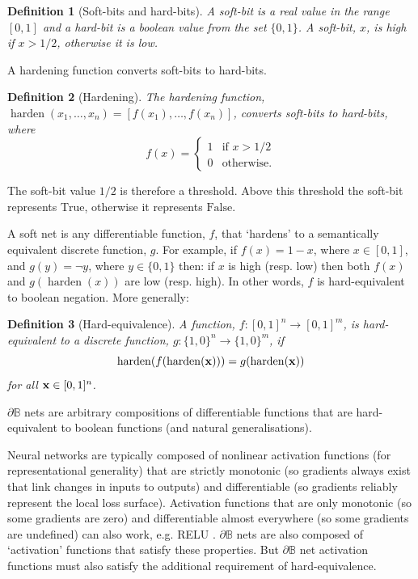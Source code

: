 \documentclass{article} %
\newtheorem*{definition}{Definition}
\begin{document}
\begin{definition}[Soft-bits and hard-bits]
A {\em soft-bit} is a real value in the range $[0,1]$ and a {\em hard-bit} is a boolean value from the set $\{0,1\}$. A soft-bit, $x$, is {\em high} if $x>1/2$, otherwise it is {\em low}.
\end{definition}

A hardening function converts soft-bits to hard-bits.

\begin{definition}[Hardening]
The {\em hardening} function, $\operatorname{harden}(x_{1}, \dots, x_{n}) = [f(x_{1}), \dots, f(x_{n})]$, converts soft-bits to hard-bits, where
\begin{equation*}
f(x) =
\begin{cases}
1 & \text{if } x > 1/2 \\
0 & \text{otherwise.}
\end{cases}
\end{equation*}
\end{definition}

The soft-bit value $1/2$ is therefore a threshold. Above this threshold the soft-bit represents $\text{True}$, otherwise it represents $\text{False}$.

A soft net is any differentiable function, $f$, that `hardens' to a semantically equivalent discrete function, $g$. For example, if $f(x) = 1 - x$, where $x \in [0,1]$, and $g(y) = \neg y$, where $y \in \{0,1\}$ then: if $x$ is high (resp. low) then both $f(x)$ and $g(\operatorname{harden}(x))$ are low (resp. high). In other words, $f$ is hard-equivalent to boolean negation. More generally:

\begin{definition}[Hard-equivalence]
	A function, $f: [0,1]^n \rightarrow [0,1]^m$, is {\em hard-equivalent} to a discrete function, $g: \{1,0\}^n \rightarrow \{1,0\}^m$,	if
	\begin{equation*}
	\operatorname{harden}(f(\operatorname{harden}({\bf x}))) = g(\operatorname{harden}({\bf x}))
	\end{equation*}
for all ${\bf x} \in [0,1]^{n}$.
\end{definition}

$\partial \mathbb{B}$ nets are arbitrary compositions of differentiable functions that are hard-equivalent to boolean functions (and natural generalisations).

Neural networks are typically composed of nonlinear activation functions (for representational generality) that are strictly monotonic (so gradients always exist that link changes in inputs to outputs) and differentiable (so gradients reliably represent the local loss surface). Activation functions that are only monotonic (so some gradients are zero) and differentiable almost everywhere (so some gradients are undefined) can also work, e.g. RELU \citep{10.5555/3104322.3104425}. $\partial \mathbb{B}$ nets are also composed of `activation' functions that satisfy these properties. But $\partial \mathbb{B}$ net activation functions must also satisfy the additional requirement of hard-equivalence.
\end{document}
